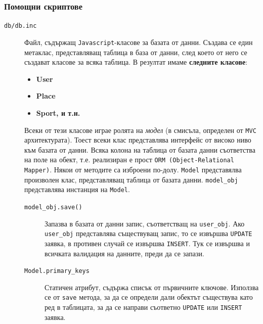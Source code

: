 \documentclass[a4paper,10pt, leqno]{article}
\newcommand{\tab}[1] {\textbf{#1}}
\newcommand{\File}[1] {\texttt{#1}}
\begin{document}
\subsubsection{Помощни скриптове}
\begin{description}
    \item[\File{db/db.inc}] Файл, съдържащ \texttt{Javascript}-класове за базата от данни.
        Създава се един метаклас, представляващ таблица в база от данни,
        след което от него се създават класове за всяка таблица. В резултат имаме \textbf{следните класове}:
        \begin{itemize}
            \item \tab{User}
            \item \tab{Place}
            \item \tab{Sport, и т.н.}
        \end{itemize}
        Всеки от тези класове играе ролята на \textit{модел} (в смисъла, определен от \texttt{MVC} архитектурата).
        Тоест всеки клас представлява интерфейс от високо ниво към базата от данни. Всяка колона на таблица 
        от базата данни съответства на поле на обект, т.е. реализиран е прост \texttt{ORM (Object-Relational Mapper)}.
        Някои от методите са изброени по-долу. \texttt{Model} представялва произволен клас, представляващ таблица от базата данни.
        \texttt{model\_obj} представлява инстанция на \texttt{Model}.

        \begin{description}
            \item[\texttt{model\_obj.save()}] Запазва в базата от данни запис, съответстващ на \texttt{user\_obj}. Ако
                \texttt{user\_obj} представлява съществуващ запис, то се извършва \texttt{UPDATE} заявка, в противен случай
                се извършва \texttt{INSERT}. Тук се извършва и всичката валидация на данните, преди да се запази.
                \item[\texttt{Model.primary\_keys}] Статичен атрибут, съдържа списък от първичните ключове. Използва се от \texttt{save} метода,
                    за да се определи дали обектът съществува като ред в таблицата, за да се направи съответно \texttt{UPDATE} или \texttt{INSERT} заявка.


\end{description}
\end{description}
\end{document}
